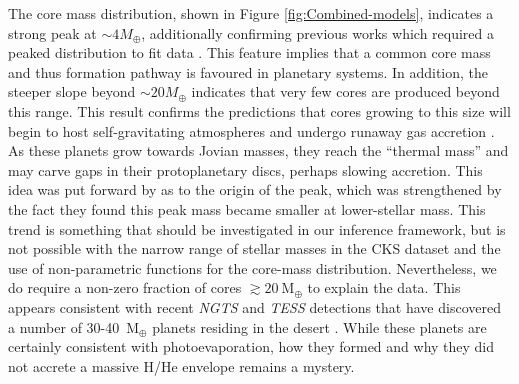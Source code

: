 \documentclass[fleqn,usenatbib]{mnras}
\begin{document}
The core mass distribution, shown in Figure \ref{fig:Combined-models}, indicates a strong peak at $\sim 4M_\oplus$, additionally confirming previous works which required a peaked distribution to fit data \citep[e.g.][]{Owen2017,Wu2019}. This feature implies that a common core mass and thus formation pathway is favoured in planetary systems. In addition, the steeper slope beyond $\sim 20 M_\oplus$ indicates that very few cores are produced beyond this range. This result confirms the predictions that cores growing to this size will begin to host self-gravitating atmospheres and undergo runaway gas accretion \citep{Pollack1996}. As these planets grow towards Jovian masses, they reach the ``thermal mass'' and may carve gaps in their protoplanetary discs, perhaps slowing accretion. This idea was put forward by \citet{Wu2019} as to the origin of the peak, which was strengthened by the fact they found this peak mass became smaller at lower-stellar mass. This trend is something that should be investigated in our inference framework, but is not possible with the narrow range of stellar masses in the CKS dataset and the use of non-parametric functions for the core-mass distribution. Nevertheless, we do require a non-zero fraction of cores $\gtrsim 20~$M$_\oplus$ to explain the data. This appears consistent with recent {\it NGTS} and {\it TESS} detections that have discovered a number of 30-40~M$_\oplus$ planets residing in the desert \citep{West2019,Jenkins2019,Armstrong2020}. While these planets are certainly consistent with photoevaporation, how they formed and why they did not accrete a massive H/He envelope remains a mystery. 
\end{document}
